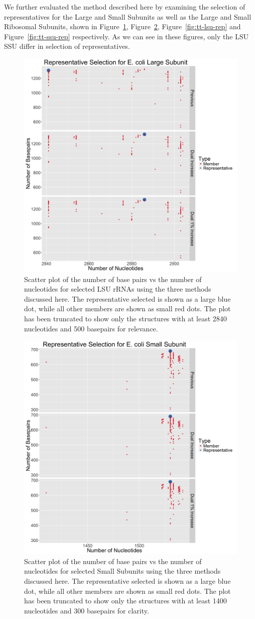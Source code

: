We further evaluated the method described here by examining the selection of
representatives for the \EC{} Large and Small Subunits as well as the \TT{}
Large and Small Ribosomal Subunits, shown in Figure~\ref{fig:ec-lsu-rep},
Figure~\ref{fig:ec-ssu-rep}, Figure~\ref{fig:tt-lsu-rep} and
Figure~\ref{fig:tt-ssu-rep} respectively. As we can see in these figures, only
the \EC{} LSU \TT{} SSU differ in selection of representatives.

\begin{figure}
  \includegraphics[width=0.5\linewidth]{chapter-4/figs/ec-lsu-rep}
  \caption{Scatter plot of the number of base pairs vs the number of nucleotides
    for selected \EC{} LSU rRNAs using the three methods discussed here.
    The representative selected is shown as a large blue dot, while all other
    members are shown as small red dots. The plot has been truncated to show
    only the structures with at least 2840 nucleotides and 500 basepairs for
  relevance.}
\label{fig:ec-lsu-rep}
\end{figure}

\begin{figure}
  \includegraphics[width=0.5\linewidth]{chapter-4/figs/ec-ssu-rep}
  \caption{Scatter plot of the number of base pairs vs the number of nucleotides
    for selected \EC{} Small Subunits using the three methods discussed here.
    The representative selected is shown as a large blue dot, while all other
    members are shown as small red dots. The plot has been truncated to show
    only the structures with at least 1400 nucleotides and 300 basepairs for
  clarity.}
\label{fig:ec-ssu-rep}
\end{figure}

